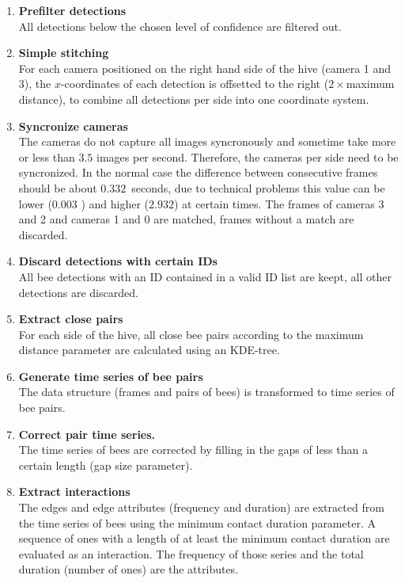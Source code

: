 \begin{enumerate}
\item \textbf{Prefilter detections}\\
All detections below the chosen level of confidence are filtered out.

\item \textbf{Simple stitching}\\
For each camera positioned on the right hand side of the hive (camera 1 and 3), the $x$-coordinates of each detection is offsetted to the right ($2\times$maximum distance), to combine all detections per side into one coordinate system.

\item \textbf{Syncronize cameras}\\
The cameras do not capture all images syncronously and sometime take more or less than $3.5$ images per second.
Therefore, the cameras per side need to be syncronized. In the normal case the difference between consecutive frames should be about $0.332$~seconds, due to technical problems this value can be lower ($0.003$ ) and higher ($2.932$) at certain times. The frames of cameras 3 and 2 and cameras 1 and 0 are matched, frames without a match are discarded.

\item \textbf{Discard detections with certain IDs}\\
All bee detections with an ID contained in a valid ID list are keept, all other detections are discarded.

\item \textbf{Extract close pairs}\\
For each side of the hive, all close bee pairs according to the maximum distance parameter are calculated using an KDE-tree.

\item \textbf{Generate time series of bee pairs}\\
The data structure (frames and pairs of bees) is transformed to time series of bee pairs.

\item \textbf{Correct pair time series.}\\
The time series of bees are corrected by filling in the gaps of less than a certain length (gap size parameter).

\item \textbf{Extract interactions}\\
The edges and edge attributes (frequency and duration) are extracted from the time series of bees using the minimum contact duration parameter.
A sequence of ones with a length of at least the minimum contact duration are evaluated as an interaction.
The frequency of those series and the total duration (number of ones) are the attributes.
\end{enumerate}


